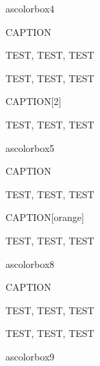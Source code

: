 ascolorbox4

\begin{ascolorbox4}{CAPTION}

TEST, TEST, TEST

\end{ascolorbox4}

\begin{ascolorbox4}{}

TEST, TEST, TEST

\end{ascolorbox4}

\begin{ascolorbox4}{CAPTION}[2]

TEST, TEST, TEST

\end{ascolorbox4}

ascolorbox5

\begin{ascolorbox5}{CAPTION}

TEST, TEST, TEST

\end{ascolorbox5}




\begin{ascolorbox5}{CAPTION}[orange]

TEST, TEST, TEST

\end{ascolorbox5}

ascolorbox8

\begin{ascolorbox8}{CAPTION}

TEST, TEST, TEST

\end{ascolorbox8}

\begin{ascolorbox8}{}

TEST, TEST, TEST

\end{ascolorbox8}

ascolorbox9

